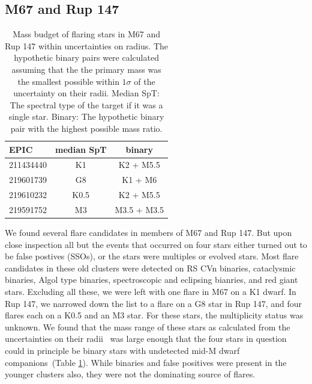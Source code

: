 \documentclass{aa}
\begin{document}
\subsection{M67 and Rup 147}
\begin{table}
\label{tab:m67_rup147_binaries}
\caption{Mass budget of flaring stars in M67 and Rup 147 within uncertainties on radius. The hypothetic binary pairs were calculated assuming that the the primary mass was the smallest possible within $1\sigma$ of the uncertainty on their radii. Median SpT: The spectral type of the target if it was a single star. Binary: The hypothetic binary pair with the highest possible mass ratio.}
\centering
\begin{tabular}{lcc}
\hline
 EPIC & median SpT &     binary \\
\hline
 211434440 &         K1 &    K2 + M5.5 \\
 219601739 &         G8 &      K1 + M6 \\
 219610232 &       K0.5 &    K2 + M5.5 \\
 219591752 &         M3 &  M3.5 + M3.5 \\
\hline
\end{tabular}
\end{table}
We found several flare candidates in members of M67 and Rup 147. But upon close inspection all but the events that occurred on four stars either turned out to be false postives (SSOs), or the stars were multiples or evolved stars. Most flare candidates in these old clusters were detected on RS CVn binaries, cataclysmic binaries, Algol type binaries, spectroscopic and eclipsing bianries, and red giant stars. Excluding all these, we were left with one flare in M67 on a K1 dwarf. In Rup 147, we narrowed down the list to a flare on a G8 star in Rup 147, and four flares each on a K0.5 and an M3 star. For these stars, the multiplicity status was unknown. We found that the mass range of these stars as calculated from the uncertainties on their radii~\citep{eker2018} was large enough that the four stars in question could in principle be binary stars with undetected mid-M dwarf companions~(Table \ref{tab:m67_rup147_binaries}). While binaries and false positives were present in the younger clusters also, they were not the dominating source of flares. 

\end{document}
